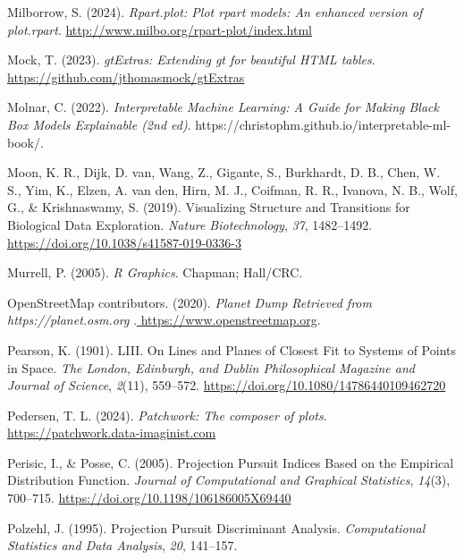 \documentclass[
  letterpaper,
]{krantz}
\newlength{\cslhangindent}
\newenvironment{CSLReferences}[2] %
 {\begin{list}{}{%
  \setlength{\itemindent}{0pt}
  \setlength{\leftmargin}{0pt}
  \setlength{\parsep}{0pt}
  \ifodd #1
   \setlength{\leftmargin}{\cslhangindent}
   \setlength{\itemindent}{-1\cslhangindent}
  \fi
  \setlength{\itemsep}{#2\baselineskip}}}
 {\end{list}}
\begin{document}
\begin{CSLReferences}{1}{0}
Milborrow, S. (2024). \emph{Rpart.plot: Plot rpart models: An enhanced
version of plot.rpart}. \url{http://www.milbo.org/rpart-plot/index.html}

Mock, T. (2023). \emph{gtExtras: Extending gt for beautiful HTML
tables}. \url{https://github.com/jthomasmock/gtExtras}

Molnar, C. (2022). \emph{Interpretable {M}achine {L}earning: A {G}uide
for {M}aking {B}lack {B}ox {M}odels {E}xplainable (2nd ed)}.
https://christophm.github.io/interpretable-ml-book/.

Moon, K. R., Dijk, D. van, Wang, Z., Gigante, S., Burkhardt, D. B.,
Chen, W. S., Yim, K., Elzen, A. van den, Hirn, M. J., Coifman, R. R.,
Ivanova, N. B., Wolf, G., \& Krishnaswamy, S. (2019). Visualizing
{S}tructure and {T}ransitions for {B}iological {D}ata {E}xploration.
\emph{Nature Biotechnology}, \emph{37}, 1482--1492.
\url{https://doi.org/10.1038/s41587-019-0336-3}

Murrell, P. (2005). \emph{R {G}raphics}. Chapman; Hall/CRC.

OpenStreetMap contributors. (2020). \emph{{Planet Dump Retrieved from
https://planet.osm.org
}}.\href{\%20https://www.openstreetmap.org\%20}{ https://www.openstreetmap.org}.

Pearson, K. (1901). LIII. On {L}ines and {P}lanes of {C}losest {F}it to
{S}ystems of {P}oints in {S}pace. \emph{The London, Edinburgh, and
Dublin Philosophical Magazine and Journal of Science}, \emph{2}(11),
559--572. \url{https://doi.org/10.1080/14786440109462720}

Pedersen, T. L. (2024). \emph{Patchwork: The composer of plots}.
\url{https://patchwork.data-imaginist.com}

Perisic, I., \& Posse, C. (2005). Projection {P}ursuit {I}ndices {B}ased
on the {E}mpirical {D}istribution {F}unction. \emph{Journal of
Computational and Graphical Statistics}, \emph{14}(3), 700--715.
\url{https://doi.org/10.1198/106186005X69440}

Polzehl, J. (1995). Projection {P}ursuit {D}iscriminant {A}nalysis.
\emph{Computational Statistics and Data Analysis}, \emph{20}, 141--157.


\end{CSLReferences}
\end{document}
